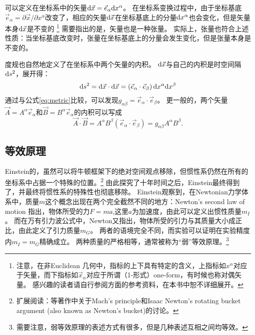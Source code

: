 可以定义在坐标系中的矢量${\rm d}\vec{x} = \vec{e}_\alpha {\rm d}x^\alpha$。
在坐标系变换过程中，由于坐标基底$\vec{e}_\alpha = \partial \vec{x}/ \partial x^\alpha$改变了，相应的矢量${\rm d}\vec{x} $在坐标基底上的分量${\rm d}x^\alpha$也会变化，但是矢量本身${\rm d}\vec{x} $是不变的
\footnote{注意，在非Euclidean 几何中，指标的上下具有特定的含义，上指标如$x^\alpha$对应于矢量，而下指标如$\vec{x}_\alpha$对应于所谓（1-形式）one-form，有时候也称对偶矢量。
感兴趣的读者请自行参阅\GR 方面的参考资料，在本书中恕不详细展开。}
需要指出的是，矢量也是一种张量。
实际上，张量也符合上述性质：当坐标基底改变时，张量在坐标基底上的分量会发生变化，但是张量本身是不变的。

度规也自然地定义了在坐标系中两个矢量的内积。
${\rm d}\vec{x}$与自己的内积是时空间隔${\rm d}s^2$，展开得：
\begin{equation}\label{eq:InnerProduct1}
  {\rm d}s^2 =  {\rm d}\vec{x}\cdot{\rm d}\vec{x} = \left(\vec{e}_\alpha \cdot \vec{e}_\beta \right) {\rm d}x^\alpha {\rm d}x^\beta
\end{equation}
通过与公式\ref{eq:metric}比较，可以发现$g_{\alpha\beta} = \vec{e}_\alpha \cdot \vec{e}_\beta$。
更一般的，两个矢量$\vec{A} = A^\alpha \vec{e}_\alpha$和$\vec{B} = B^\alpha \vec{e}_\alpha$的内积可以写成
\begin{equation}\label{eq:InnerProduct2}
  \vec{A}\cdot\vec{B}= A^\alpha B^\beta \left(\vec{e}_\alpha \cdot \vec{e}_\beta \right) =  g_{\alpha \beta}A^\alpha B^\beta.
\end{equation}

\subsection{等效原理}
Einstein的\SR，虽然可以将牛顿框架下的绝对空间观点移除，但惯性系仍然在所有的坐标系中占据一个特殊的位置。\footnote{扩展阅读：\cite{Rindler:GR}等著作中关于Mach's principle和Isaac Newton's rotating bucket argument (also known as Newton's bucket)的讨论。}
由此探究了十年时间之后，Einstein最终得到了\GR ，并最终将惯性系的特殊性也彻底移除。
Einstein观察到，在Newtonian力学体系中，质量$m$这个概念出现在两个完全截然不同的地方：Newton's second law of motion 指出，物体所受的力$F=ma$,这里$a$为加速度，由此可以定义出惯性质量$m_I$。
而在万有引力波公式中，Newton又指出，物体所受的引力与其质量大小成正比，由此定义了引力质量$m_G$。
两者的语境完全不同，而实验可以证明在实验精度内$m_I = m_G$精确成立。
两种质量的严格相等，通常被称为“弱”等效原理。\footnote{需要注意，弱等效原理的表述方式有很多，但是几种表述互相之间均等效。}

